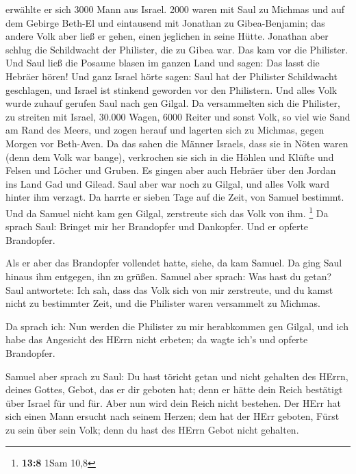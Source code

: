  erwählte er sich 3000 Mann aus Israel. 2000 waren mit Saul
zu Michmas und auf dem Gebirge Beth-El und eintausend mit Jonathan zu
Gibea-Benjamin; das andere Volk aber ließ er gehen, einen jeglichen in
seine Hütte.  Jonathan aber schlug die Schildwacht der
Philister, die zu Gibea war. Das kam vor die Philister. Und Saul ließ
die Posaune blasen im ganzen Land und sagen: Das lasst die Hebräer
hören!  Und ganz Israel hörte sagen: Saul hat der Philister
Schildwacht geschlagen, und Israel ist stinkend geworden vor den
Philistern. Und alles Volk wurde zuhauf gerufen Saul nach gen Gilgal.
 Da versammelten sich die Philister, zu streiten mit Israel,
30.000 Wagen, 6000 Reiter und sonst Volk, so viel wie Sand am Rand des
Meers, und zogen herauf und lagerten sich zu Michmas, gegen Morgen vor
Beth-Aven.  Da das sahen die Männer Israels, dass sie in
Nöten waren (denn dem Volk war bange), verkrochen sie sich in die Höhlen
und Klüfte und Felsen und Löcher und Gruben.  Es gingen aber
auch Hebräer über den Jordan ins Land Gad und Gilead. Saul aber war noch
zu Gilgal, und alles Volk ward hinter ihm verzagt.  Da
harrte er sieben Tage auf die Zeit, von Samuel bestimmt. Und da Samuel
nicht kam gen Gilgal, zerstreute sich das Volk von ihm. \footnote{\textbf{13:8}
  1Sam 10,8}  Da sprach Saul: Bringet mir her Brandopfer und
Dankopfer. Und er opferte Brandopfer.

 Als er aber das Brandopfer vollendet hatte, siehe, da kam
Samuel. Da ging Saul hinaus ihm entgegen, ihn zu grüßen. 
Samuel aber sprach: Was hast du getan? Saul antwortete: Ich sah, dass
das Volk sich von mir zerstreute, und du kamst nicht zu bestimmter Zeit,
und die Philister waren versammelt zu Michmas.

 Da sprach ich: Nun werden die Philister zu mir herabkommen
gen Gilgal, und ich habe das Angesicht des HErrn nicht erbeten; da wagte
ich's und opferte Brandopfer.

 Samuel aber sprach zu Saul: Du hast töricht getan und
nicht gehalten des HErrn, deines Gottes, Gebot, das er dir geboten hat;
denn er hätte dein Reich bestätigt über Israel für und für.
 Aber nun wird dein Reich nicht bestehen. Der HErr hat sich
einen Mann ersucht nach seinem Herzen; dem hat der HErr geboten, Fürst
zu sein über sein Volk; denn du hast des HErrn Gebot nicht gehalten.

